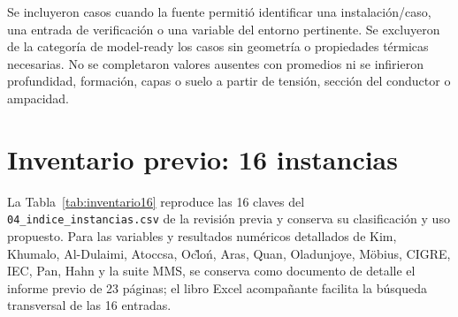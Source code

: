 \documentclass[11pt,a4paper,oneside]{report}
\begin{document}
Se incluyeron casos cuando la fuente permiti\'o identificar una instalaci\'on/caso, una entrada de verificaci\'on o una variable del entorno pertinente. Se excluyeron de la categor\'ia de model-ready los casos sin geometr\'ia o propiedades t\'ermicas necesarias. No se completaron valores ausentes con promedios ni se infirieron profundidad, formaci\'on, capas o suelo a partir de tensi\'on, secci\'on del conductor o ampacidad.

\chapter*{Inventario previo: 16 instancias}
La Tabla~\ref{tab:inventario16} reproduce las 16 claves del \texttt{04\_indice\_instancias.csv} de la revisi\'on previa y conserva su clasificaci\'on y uso propuesto. Para las variables y resultados num\'ericos detallados de Kim, Khumalo, Al-Dulaimi, Atoccsa, Oc\~lo\'n, Aras, Quan, Oladunjoye, M\"obius, CIGRE, IEC, Pan, Hahn y la suite MMS, se conserva como documento de detalle el informe previo de 23 p\'aginas; el libro Excel acompa\~nante facilita la b\'usqueda transversal de las 16 entradas.
\end{document}
